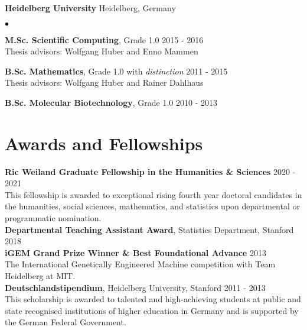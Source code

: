 \documentclass[margin,line]{res}
\newenvironment{list2}{
  \begin{list}{$\bullet$}{%
      \setlength{\itemsep}{0in}
      \setlength{\parsep}{0in} \setlength{\parskip}{0in}
      \setlength{\topsep}{0in} \setlength{\partopsep}{0in}
      \setlength{\leftmargin}{0.2in}}}{\end{list}}
\begin{document}
\begin{resume}
\vspace*{-2.5mm}
{\bf {Heidelberg University}} \hfill  {Heidelberg, Germany}\\
\vspace*{-.14in}
\begin{list2}
\item \textbf{M.Sc. Scientific Computing}, Grade 1.0 \hfill 2015 - 2016\\
Thesis advisors: Wolfgang Huber and Enno Mammen 
\item \textbf{B.Sc. Mathematics}, Grade 1.0 with \emph{distinction} \hfill 2011 - 2015\\
Thesis advisors: Wolfgang Huber and Rainer Dahlhaus 
\item \textbf{B.Sc. Molecular Biotechnology}, Grade 1.0 \hfill 2010 - 2013
\end{list2}


\section{\sc Awards and Fellowships }
\textbf{Ric Weiland Graduate Fellowship  in the Humanities \& Sciences } \hfill 2020 - 2021\\
This fellowship is awarded to exceptional rising fourth year doctoral candidates in the humanities, social sciences, mathematics, and
statistics upon departmental or programmatic nomination.\\
\textbf{Departmental Teaching Assistant Award}, Statistics Department, Stanford  \hfill  2018\\
\textbf{iGEM Grand Prize Winner \& Best Foundational Advance} \hfill  2013 \\
The International Genetically Engineered Machine competition with Team Heidelberg at MIT.\\
\textbf{Deutschlandstipendium}, Heidelberg University, Stanford \hfill 2011 - 2013\\
This scholarship is awarded to talented and high-achieving students at public and state recognised institutions of higher education in Germany and is supported by the German Federal Government.







\end{resume}
\end{document}
